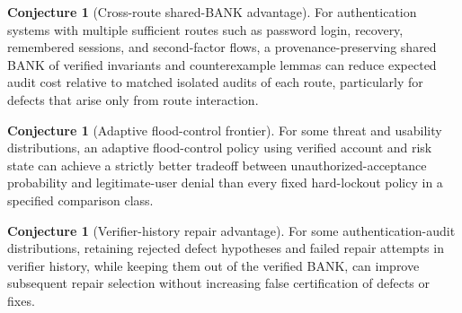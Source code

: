 \documentclass[11pt,openany]{book}
\theoremstyle{definition}
\newtheorem{conjecture}[theorem]{Conjecture}
\theoremstyle{remark}
\begin{document}
\begin{conjecture}[Cross-route shared-BANK advantage]\label{conj:crossroute}
For authentication systems with multiple sufficient routes such as password login, recovery, remembered sessions, and second-factor flows, a provenance-preserving shared BANK of verified invariants and counterexample lemmas can reduce expected audit cost relative to matched isolated audits of each route, particularly for defects that arise only from route interaction.
\end{conjecture}

\begin{conjecture}[Adaptive flood-control frontier]\label{conj:floodfrontier}
For some threat and usability distributions, an adaptive flood-control policy using verified account and risk state can achieve a strictly better tradeoff between unauthorized-acceptance probability and legitimate-user denial than every fixed hard-lockout policy in a specified comparison class.
\end{conjecture}

\begin{conjecture}[Verifier-history repair advantage]\label{conj:authhistory}
For some authentication-audit distributions, retaining rejected defect hypotheses and failed repair attempts in verifier history, while keeping them out of the verified BANK, can improve subsequent repair selection without increasing false certification of defects or fixes.
\end{conjecture}
\end{document}
